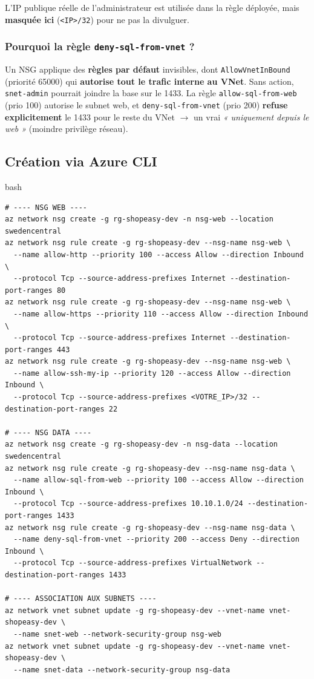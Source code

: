 \documentclass[11pt,a4paper]{article}
\newcommand{\arr}{\ensuremath{\rightarrow}}
\newcommand{\code}[1]{\texttt{#1}}
\begin{document}
\begin{notebox}[Confidentialité]
L'IP publique réelle de l'administrateur est utilisée dans la règle déployée, mais \textbf{masquée ici}
(\code{<IP>/32}) pour ne pas la divulguer.
\end{notebox}

\subsubsection{Pourquoi la règle \code{deny-sql-from-vnet} ?}
Un NSG applique des \textbf{règles par défaut} invisibles, dont \code{AllowVnetInBound} (priorité 65000) qui
\textbf{autorise tout le trafic interne au VNet}. Sans action, \code{snet-admin} pourrait joindre la base sur
le 1433. La règle \code{allow-sql-from-web} (prio 100) autorise le subnet web, et \code{deny-sql-from-vnet}
(prio 200) \textbf{refuse explicitement} le 1433 pour le reste du VNet \arr{} un vrai \textit{« uniquement depuis
le web »} (moindre privilège réseau).

\subsection{Création via Azure CLI}
\begin{codebox}{bash}
\begin{Verbatim}
# ---- NSG WEB ----
az network nsg create -g rg-shopeasy-dev -n nsg-web --location swedencentral
az network nsg rule create -g rg-shopeasy-dev --nsg-name nsg-web \
  --name allow-http --priority 100 --access Allow --direction Inbound \
  --protocol Tcp --source-address-prefixes Internet --destination-port-ranges 80
az network nsg rule create -g rg-shopeasy-dev --nsg-name nsg-web \
  --name allow-https --priority 110 --access Allow --direction Inbound \
  --protocol Tcp --source-address-prefixes Internet --destination-port-ranges 443
az network nsg rule create -g rg-shopeasy-dev --nsg-name nsg-web \
  --name allow-ssh-my-ip --priority 120 --access Allow --direction Inbound \
  --protocol Tcp --source-address-prefixes <VOTRE_IP>/32 --destination-port-ranges 22

# ---- NSG DATA ----
az network nsg create -g rg-shopeasy-dev -n nsg-data --location swedencentral
az network nsg rule create -g rg-shopeasy-dev --nsg-name nsg-data \
  --name allow-sql-from-web --priority 100 --access Allow --direction Inbound \
  --protocol Tcp --source-address-prefixes 10.10.1.0/24 --destination-port-ranges 1433
az network nsg rule create -g rg-shopeasy-dev --nsg-name nsg-data \
  --name deny-sql-from-vnet --priority 200 --access Deny --direction Inbound \
  --protocol Tcp --source-address-prefixes VirtualNetwork --destination-port-ranges 1433

# ---- ASSOCIATION AUX SUBNETS ----
az network vnet subnet update -g rg-shopeasy-dev --vnet-name vnet-shopeasy-dev \
  --name snet-web --network-security-group nsg-web
az network vnet subnet update -g rg-shopeasy-dev --vnet-name vnet-shopeasy-dev \
  --name snet-data --network-security-group nsg-data
\end{Verbatim}
\end{codebox}
\end{document}
